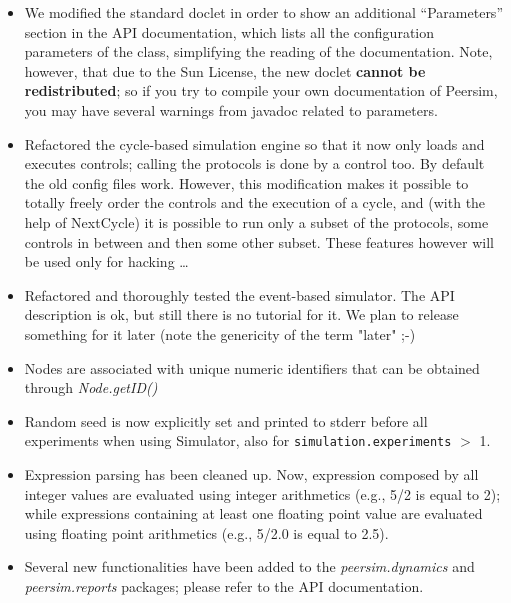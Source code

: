 \documentclass[a4paper,11pt]{article}
\begin{document}
\begin{itemize}

\item We modified the standard doclet in order to show an additional 
  ``Parameters'' section in the API documentation, which lists all the
  configuration parameters of the class, simplifying the reading of
  the documentation. Note, however, that due to the Sun License, 
  the new doclet \textbf{cannot be redistributed}; so if you try to compile
  your own documentation of Peersim, you may have several warnings
  from javadoc related to parameters.

\item Refactored the cycle-based simulation engine so that it now only
  loads and  
  executes controls; calling the protocols is done by a control too. By default
  the old config files work. However, this modification makes it possible
  to totally freely order the controls and the execution of a cycle, and
  (with the help of NextCycle) it is possible to run only a subset of the
  protocols, some controls in between and then some other subset. These
  features however will be used only for hacking \dots

\item Refactored and thoroughly tested the event-based simulator. The API
  description is ok, but still there is no tutorial for it. We plan
  to release something for it later (note the genericity of the
  term "later" ;-)

\item Nodes are associated with unique numeric identifiers that can be obtained
  through \emph{Node.getID()}

\item Random seed is now explicitly set and printed to stderr before all
  experiments when using Simulator, also for
  \texttt{simulation.experiments} $>$ 1.

\item Expression parsing has been cleaned up. Now, expression composed by
  all integer values are evaluated using integer arithmetics (e.g.,
  5/2 is equal to 2); while expressions containing at least one floating
  point value are evaluated using floating point arithmetics (e.g.,
  5/2.0 is equal to 2.5).

\item Several new functionalities have been added to the
  \emph{peersim.dynamics} 
  and \emph{peersim.reports} packages; please refer to the API documentation.

\end{itemize}
\end{document}
